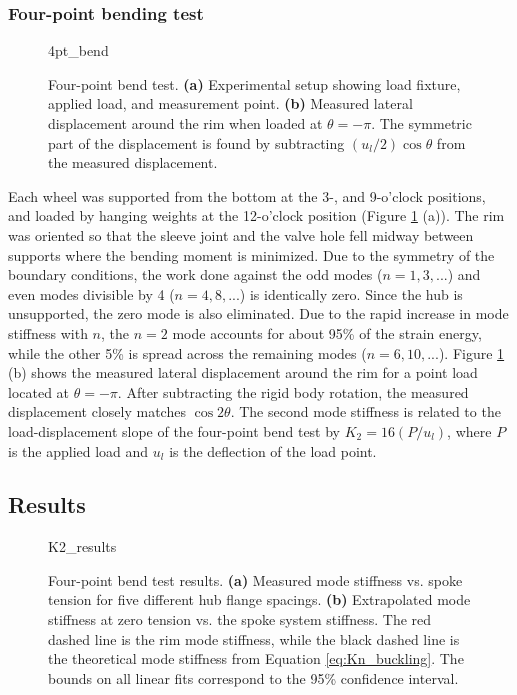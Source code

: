\documentclass[\rootdir/thesis.tex]{subfiles}
\begin{document}
\subsubsection{Four-point bending test}

\begin{figure}[t]
\centering
{4pt_bend}
\caption{Four-point bend test. \textbf{(a)} Experimental setup showing load fixture, applied load, and measurement point. \textbf{(b)} Measured lateral displacement around the rim when loaded at $\theta=-\pi$. The symmetric part of the displacement is found by subtracting $(u_l/2)\cos{\theta}$ from the measured displacement.}
\label{fig:4pt_bend_setup}
\end{figure}

Each wheel was supported from the bottom at the 3-, and 9-o'clock positions, and loaded by hanging weights at the 12-o'clock position (Figure \ref{fig:4pt_bend_setup} (a)). The rim was oriented so that the sleeve joint and the valve hole fell midway between supports where the bending moment is minimized. Due to the symmetry of the boundary conditions, the work done against the odd modes ($n=1, 3, ...$) and even modes divisible by 4 ($n=4, 8, ...$) is identically zero. Since the hub is unsupported, the zero mode is also eliminated. Due to the rapid increase in mode stiffness with $n$, the $n=2$ mode accounts for about 95\% of the strain energy, while the other 5\% is spread across the remaining modes ($n=6, 10, ...$). Figure \ref{fig:4pt_bend_setup} (b) shows the measured lateral displacement around the rim for a point load located at $\theta=-\pi$. After subtracting the rigid body rotation, the measured displacement closely matches $\cos{2\theta}$. The second mode stiffness is related to the load-displacement slope of the four-point bend test by $K_2 = 16(P/u_l)$, where $P$ is the applied load and $u_l$ is the deflection of the load point.

\subsection{Results}
\label{sec:K2_T_results}

\begin{figure}[t]
\centering
{K2_results}
\caption{Four-point bend test results. \textbf{(a)} Measured mode stiffness vs. spoke tension for five different hub flange spacings. \textbf{(b)} Extrapolated mode stiffness at zero tension vs. the spoke system stiffness. The red dashed line is the rim mode stiffness, while the black dashed line is the theoretical mode stiffness from Equation \eqref{eq:Kn_buckling}. The bounds on all linear fits correspond to the 95\% confidence interval.}
\label{fig:K2_results}
\end{figure}
\end{document}
